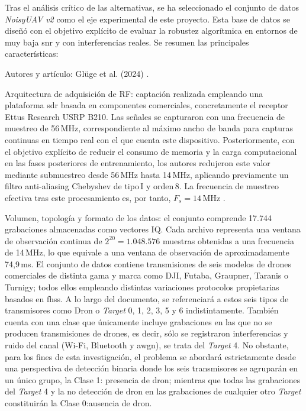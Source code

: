 Tras el análisis crítico de las alternativas, se ha seleccionado el conjunto de datos \textit{NoisyUAV v2} como el eje experimental de este proyecto. Esta base de datos se diseñó con el objetivo explícito de evaluar la robustez algorítmica en entornos de muy baja \gls{snr} y con interferencias reales. Se resumen las principales características:

Autores y artículo: Glüge et al. (2024) \cite{gluge_robust_2024}.

Arquitectura de adquisición de RF: captación realizada empleando una plataforma \gls{sdr} basada en componentes comerciales, concretamente el receptor Ettus Research USRP B210. Las señales se capturaron con una frecuencia de muestreo de 56\,MHz, correspondiente al máximo ancho de banda para capturas continuas en tiempo real con el que cuenta este dispositivo. Posteriormente, con el objetivo explícito de reducir el consumo de memoria y la carga computacional en las fases posteriores de entrenamiento, los autores redujeron este valor mediante submuestreo desde 56\,MHz hasta 14\,MHz, aplicando previamente un filtro anti-aliasing Chebyshev de tipo\,I y orden\,8. La frecuencia de muestreo efectiva tras este procesamiento es, por tanto, $F_s = 14$\,MHz \cite{gluge_robust_2024}.

Volumen, topología y formato de los datos: el conjunto comprende 17.744 grabaciones almacenadas como vectores IQ. Cada archivo representa una ventana de observación continua de $2^{20} = 1.048.576$ muestras obtenidas a una frecuencia de 14\,MHz, lo que equivale a una ventana de observación de aproximadamente 74,9\,ms. El conjunto de datos contiene transmisiones de seis modelos de drones comerciales de distinta gama y marca como DJI, Futaba, Graupner, Taranis o Turnigy; todos ellos empleando distintas variaciones protocolos propietarias basados en \gls{fhss}. A lo largo del documento, se referenciará a estos seis tipos de transmisores como Dron o \textit{Target} 0, 1, 2, 3, 5 y 6 indistintamente. También cuenta con una clase que únicamente incluye grabaciones en las que no se producen transmisiones de drones, es decir, sólo se registraron interferencias y ruido del canal (Wi-Fi, Bluetooth y \gls{awgn}), se trata del \textit{Target} 4. No obstante, para los fines de esta investigación, el problema se abordará estrictamente desde una perspectiva de detección binaria donde los seis transmisores se agruparán en un único grupo, la Clase 1: presencia de dron; mientras que todas las grabaciones del \textit{Target} 4 y la no detección de dron en las grabaciones de cualquier otro \textit{Target} constituirán la Clase 0:ausencia de dron.

